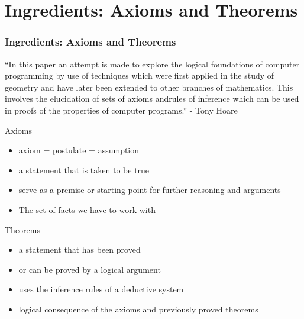 \documentclass{beamer}
\begin{document}
\section{Ingredients: Axioms and Theorems}
\begin{frame}
        \frametitle{Ingredients: Axioms and Theorems}
	“In this paper an attempt is made to explore the logical foundations of computer programming
	by use of techniques which were first applied in the study of \colorbox{yellow!30}{geometry} and have later been
	extended to other branches of mathematics. This involves the elucidation of sets of \colorbox{blue!30}{axioms}
	and\colorbox{blue!30}{rules of inference} which can be used in proofs of the properties of computer programs.” - Tony Hoare
\end{frame}

\begin{frame}
\begin{minipage}[t]{0.48\linewidth}
	Axioms
                \begin{itemize}
            \item axiom = postulate = assumption
            \item a statement that is taken to be true
        \item  serve as a premise or starting point for further reasoning and arguments
            \item The set of facts we have to work with
        \end{itemize}
    \end{minipage}
    \hfill
        \pause
    \begin{minipage}[t]{0.48\linewidth}
	    Theorems
        \begin{itemize}
            \item a statement that has been proved
            \item or can be proved by a logical argument
            \item uses the inference rules of a deductive system
            \item logical consequence of the axioms and previously proved theorems
        \end{itemize}
    \end{minipage}
\end{frame}
\end{document}
